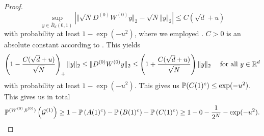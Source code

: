 \begin{proof}
\begin{equation*}
\underset{y \in \overline{B}_d(0,1)}{\sup} \left\vert \Vert \sqrt{N}D^{(0)}W^{(0)}y\Vert_2 - \sqrt{N} \Vert y \Vert_2 \right\vert \leq C (\sqrt{d} + u)
\end{equation*}
with probability at least $ 1-\exp(- u ^2)$, where we employed . $C> 0$ is an absolute constant according to . This yields
\begin{equation*}
\left(1 - \frac{C(\sqrt{d} + u)}{\sqrt{N}}\right)_+\Vert y \Vert_2 \leq \Vert D^{(0)}W^{(0)}y \Vert_2 \leq \left( 1+ \frac{C(\sqrt{d} + u)}{\sqrt{N}}\right) \Vert y \Vert_2 \quad \text{ for all } y \in \mathbb{R}^d
\end{equation*}
with probability at least $1 - \exp(-u^2)$. This gives us $\mathbb{P}(C(1)^c) \leq \exp(-u^2)$. This gives us in total
\begin{equation*}
\mathbb{P}^{(W^{(0)},b^{(0)})}\left(\mathcal{G}^{(1)}\right) \geq 1 - \mathbb{P}\left(A(1)^c\right)-\mathbb{P}\left(B(1)^c\right)-\mathbb{P}\left(C(1)^c\right) \geq 1 - 0 - \frac{1}{2^N} - \exp(-u^2).
\end{equation*}


\end{proof}
